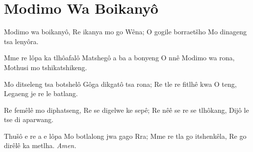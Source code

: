 \starttocol
\chapter{Modimo Wa Boikany\^o}
\nexttocol
\hfill{\it }
\stoptocol
\starttocol
\startlines
{\sc Modimo} wa boikany\^o, 
Re ikanya mo go W\^ena; 
O gogile borraet\v sho 
Mo dinageng tsa leny\^ora.

Mme re l\^opa ka tlh\^oafal\^o 
Matsheg\^o a ba a bonyeng
O nn\^e Modimo wa rona,
Mothusi mo tshikatshikeng.

Mo ditseleng tsa botshel\^o
G\^oga dikgat\^o tsa rona;
Re tle re fitlh\^e kwa O teng,
Legaeng je re le batlang.

Re fem\^el\^e mo diphatseng,
Re se digelwe ke sep\^e;
Re n\^e\^e se re se tlh\^okang,
Dij\^o le tse di aparwang.

Thu\v s\^o e re a e l\^opa
Mo botlalong jwa gago Rra;
Mme re tla go itshenk\^ela,
Re go dir\^el\^e ka metlha.                                
          \hfill{\it Amen.}~~~~~~~~~
\stoplines
\nexttocol

\stoptocol
